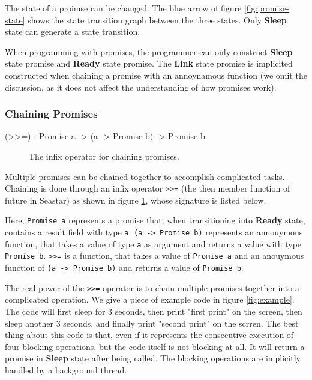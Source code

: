 The state of a proimse can be changed. The blue arrow of figure
\ref{fig:promise-state} shows the state transition graph between the three
states. Only \textbf{Sleep} state can generate a state transition.

When programming with promises, the programmer can only construct \textbf{Sleep}
state promise and \textbf{Ready} state promise. The \textbf{Link} state promise
is implicited constructed when chaining a promise with an annoynamous function
(we omit the discussion, as it does not affect the understanding of how promises
work).

\subsubsection{Chaining Promises}

\begin{verbbox}(>>=) : Promise a -> (a -> Promise b) -> Promise b \end{verbbox}

\begin{figure}[!h]
\resizebox{0.95\columnwidth}{!}{\theverbbox}
\caption{The infix operator for chaining promises.}
\label{fig:infix}
\end{figure}



Multiple promises can be chained together to accomplish complicated
tasks. Chaining is done through an infix operator \verb!>>=! (the then member
function of future in Seastar) as shown in figure \ref{fig:infix}, whose
signature is listed below.

Here, \verb!Promise a! represents a promise that, when transitioning into
\textbf{Ready} state, contains a result field with type \verb!a!. \verb!(a -> Promise b)!
represents an annouymous function, that takes a value of type \verb!a! as
argument and returns a value with type \verb!Promise b!. \verb!>>=! is a
function, that takes a value of \verb!Promise a! and an anouymous function of
\verb!(a -> Promise b)! and returns a value of \verb!Promise b!.

The real power of the \verb!>>=! operator is to chain multiple promises together
into a complicated operation. We give a piece of example code in figure
\ref{fig:example}. The code will first sleep for 3 seconds, then print "first
print" on the screen, then sleep another 3 seconds, and finally print "second
print" on the scrren. The best thing about this code is that, even if it
represents the consecutive execution of four blocking operations, but the code
itself is not blocking at all. It will return a promise in \textbf{Sleep} state
after being called. The blocking operations are implicitly handled by a
background thread.

